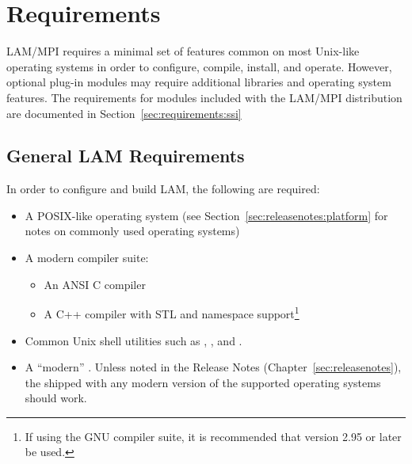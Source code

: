 %
% 
%
%

\chapter{Requirements}
\label{sec:requirements}

LAM/MPI requires a minimal set of features common on most Unix-like
operating systems in order to configure, compile, install, and
operate.  However, optional plug-in modules may require additional
libraries and operating system features.  The requirements for modules
included with the LAM/MPI distribution are documented in
Section~\ref{sec:requirements:ssi}


\section{General LAM Requirements}

In order to configure and build LAM, the following are required:

\begin{itemize}
\item A POSIX-like operating system (see
  Section~\ref{sec:releasenotes:platform} for notes on commonly used
  operating systems)
  
\item A modern compiler suite:
  \begin{itemize}
  \item An ANSI C compiler
  \item A C++ compiler with STL and namespace support\footnote{If
      using the GNU compiler suite, it is recommended that version
      2.95 or later be used.}
  \end{itemize}
  
\item Common Unix shell utilities such as , , and
  .
  
\item A ``modern'' .  Unless noted in the Release Notes
  (Chapter~\ref{sec:releasenotes}), the  shipped with any
  modern version of the supported operating systems should work.
\end{itemize}

